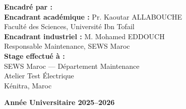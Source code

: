 \begin{titlepage}
\begin{flushleft}
\textbf{\large Encadré par :}\\[0.2cm]
\quad \textbf{Encadrant académique :} Pr. Kaoutar ALLABOUCHE\\
\quad \quad Faculté des Sciences, Université Ibn Tofail\\[0.4cm]
\quad \textbf{Encadrant industriel :} M. Mohamed EDDOUCH\\
\quad \quad Responsable Maintenance, SEWS Maroc\\[0.8cm]

\textbf{\large Stage effectué à :}\\[0.2cm]
\quad SEWS Maroc --- Département Maintenance\\
\quad Atelier Test Électrique\\
\quad Kénitra, Maroc\\[0.4cm]
\end{flushleft}

\vfill

{\large\bfseries Année Universitaire 2025--2026}

\end{titlepage}

\clearpage
